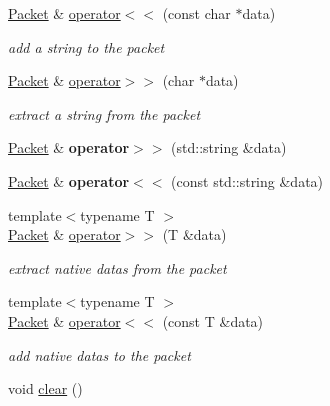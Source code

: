 \begin{DoxyCompactItemize}
\hyperlink{classmognetwork_1_1_packet}{Packet} \& \hyperlink{classmognetwork_1_1_packet_a9f73147d9c2ddab57757a27aa110de0f}{operator$<$$<$} (const char $\ast$data)
\begin{DoxyCompactList}\small\item\em add a string to the packet \end{DoxyCompactList}\item 
\hyperlink{classmognetwork_1_1_packet}{Packet} \& \hyperlink{classmognetwork_1_1_packet_ab2a38323cc0a32e79520fdf71ee0d1a9}{operator$>$$>$} (char $\ast$data)
\begin{DoxyCompactList}\small\item\em extract a string from the packet \end{DoxyCompactList}\item 
\hypertarget{classmognetwork_1_1_packet_aaded256ae54c105b17188102a65e9368}{\hyperlink{classmognetwork_1_1_packet}{Packet} \& {\bfseries operator$>$$>$} (std\-::string \&data)}\label{classmognetwork_1_1_packet_aaded256ae54c105b17188102a65e9368}

\item 
\hypertarget{classmognetwork_1_1_packet_a2bdf5ff2476680c7e6c549bb42ea6856}{\hyperlink{classmognetwork_1_1_packet}{Packet} \& {\bfseries operator$<$$<$} (const std\-::string \&data)}\label{classmognetwork_1_1_packet_a2bdf5ff2476680c7e6c549bb42ea6856}

\item 
{\footnotesize template$<$typename T $>$ }\\\hyperlink{classmognetwork_1_1_packet}{Packet} \& \hyperlink{classmognetwork_1_1_packet_acdecf105b9afb3c4c499bfffa9cf2fbb}{operator$>$$>$} (T \&data)
\begin{DoxyCompactList}\small\item\em extract native datas from the packet \end{DoxyCompactList}\item 
{\footnotesize template$<$typename T $>$ }\\\hyperlink{classmognetwork_1_1_packet}{Packet} \& \hyperlink{classmognetwork_1_1_packet_a84ffd95a38d7bca83675a5c932d04735}{operator$<$$<$} (const T \&data)
\begin{DoxyCompactList}\small\item\em add native datas to the packet \end{DoxyCompactList}\item 
\hypertarget{classmognetwork_1_1_packet_aaa034856ddb45ebf35dcefd6d58563d9}{void \hyperlink{classmognetwork_1_1_packet_aaa034856ddb45ebf35dcefd6d58563d9}{clear} ()}\label{classmognetwork_1_1_packet_aaa034856ddb45ebf35dcefd6d58563d9}


\end{DoxyCompactItemize}
